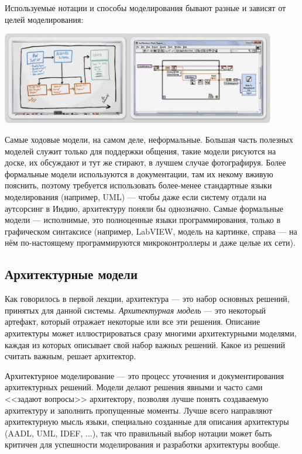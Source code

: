 \documentclass{../../text-style}
\begin{document}
Используемые нотации и способы моделирования бывают разные и зависят от целей моделирования:

\begin{center}
    \includegraphics[width=0.9\textwidth]{sketchesVsFormalNotations.png}
\end{center}

Самые ходовые модели, на самом деле, неформальные. Большая часть полезных моделей служит только для поддержки общения, такие модели рисуются на доске, их обсуждают и тут же стирают, в лучшем случае фотографируя. Более формальные модели используются в документации, там их некому вживую пояснить, поэтому требуется использовать более-менее стандартные языки моделирования (например, UML) --- чтобы даже если систему отдали на аутсорсинг в Индию, архитектуру поняли бы однозначно. Самые формальные модели --- исполнимые, это полноценные языки программирования, только в графическом синтаксисе (например, LabVIEW, модель на картинке, справа --- на нём по-настоящему программируются микроконтроллеры и даже целые их сети).

\subsection{Архитектурные модели}

Как говорилось в первой лекции, архитектура --- это набор основных решений, принятых для данной системы. \textit{Архитектурная модель} --- это некоторый артефакт, который отражает некоторые или все эти решения. Описание архитектуры может иллюстрироваться сразу многими архитектурными моделями, каждая из которых описывает свой набор важных решений. Какое из решений считать важным, решает архитектор.

Архитектурное моделирование --- это процесс уточнения и документирования архитектурных решений. Модели делают решения явными и часто сами <<задают вопросы>> архитектору, позволяя лучше понять создаваемую архитектуру и заполнить пропущенные моменты. Лучше всего направляют архитектурную мысль языки, специально созданные для описания архитектуры (AADL, UML, IDEF, ...), так что правильный выбор нотации может быть критичен для успешности моделирования и разработки архитектуры вообще.
\end{document}
